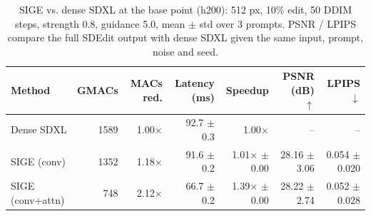 \begin{table}[t]
\centering
\small
\caption{SIGE vs. dense SDXL at the base point (h200): 512 px, 10\% edit, 50 DDIM steps, strength 0.8, guidance 5.0, mean $\pm$ std over 3 prompts. PSNR / LPIPS compare the full SDEdit output with dense SDXL given the same input, prompt, noise and seed.}
\label{tab:baseline_h200}
\begin{tabular}{lrrrrrr}
\toprule
Method & GMACs & MACs red. & Latency (ms) & Speedup & PSNR (dB) $\uparrow$ & LPIPS $\downarrow$ \\
\midrule
Dense SDXL & 1589 & 1.00$\times$ & 92.7 $\pm$ 0.3 & 1.00$\times$ & -- & -- \\
SIGE (conv) & 1352 & 1.18$\times$ & 91.6 $\pm$ 0.2 & 1.01$\times$ $\pm$ 0.00 & 28.16 $\pm$ 3.06 & 0.054 $\pm$ 0.020 \\
SIGE (conv+attn) & 748 & 2.12$\times$ & 66.7 $\pm$ 0.2 & 1.39$\times$ $\pm$ 0.00 & 28.22 $\pm$ 2.74 & 0.052 $\pm$ 0.028 \\
\bottomrule
\end{tabular}
\end{table}

